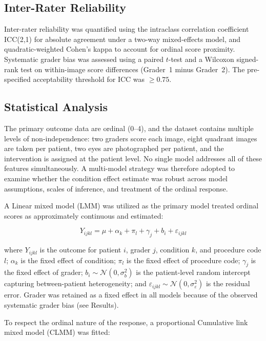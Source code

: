 \subsection{Inter-Rater Reliability}

Inter-rater reliability was quantified using the intraclass correlation coefficient ICC(2,1) for absolute agreement under a two-way mixed-effects model, and quadratic-weighted Cohen's kappa to account for ordinal score proximity. Systematic grader bias was assessed using a paired $t$-test and a Wilcoxon signed-rank test on within-image score differences (Grader~1 minus Grader~2). The pre-specified acceptability threshold for ICC was $\geq 0.75$.

\subsection{Statistical Analysis}

The primary outcome data are ordinal (0--4), and the dataset contains multiple levels of non-independence: two graders score each image, eight quadrant images are taken per patient, two eyes are photographed per patient, and the intervention is assigned at the patient level. No single model addresses all of these features simultaneously. A multi-model strategy was therefore adopted to examine whether the condition effect estimate was robust across model assumptions, scales of inference, and treatment of the ordinal response.

A Linear mixed model (LMM) was utilized as the primary model treated ordinal scores as approximately continuous and estimated:

\begin{equation}
Y_{ijkl} = \mu + \alpha_k + \pi_l + \gamma_j + b_i + \varepsilon_{ijkl}
\label{eq:lmm}
\end{equation}

\noindent where $Y_{ijkl}$ is the outcome for patient $i$, grader $j$, condition $k$, and procedure code $l$; $\alpha_k$ is the fixed effect of condition; $\pi_l$ is the fixed effect of procedure code; $\gamma_j$ is the fixed effect of grader; $b_i \sim \mathcal{N}(0,\sigma^2_b)$ is the patient-level random intercept capturing between-patient heterogeneity; and $\varepsilon_{ijkl} \sim \mathcal{N}(0,\sigma^2_\varepsilon)$ is the residual error. Grader was retained as a fixed effect in all models because of the observed systematic grader bias (see Results).

To respect the ordinal nature of the response, a proportional Cumulative link mixed model (CLMM) was fitted:

